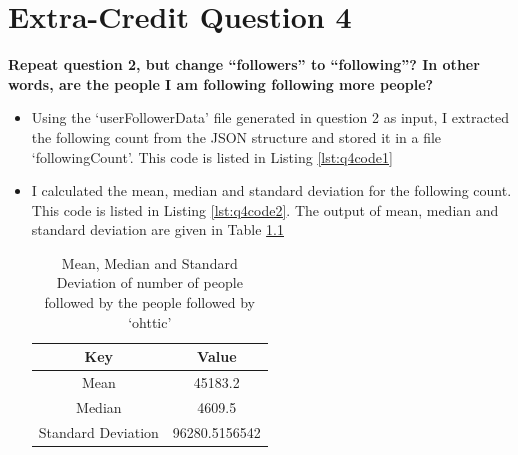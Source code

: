 \chapter{Extra-Credit Question 4}
\label{available-representation}

\textbf{Repeat question 2, but change ``followers'' to ``following''?  In other words, are the people I am following following more people?}

\begin{itemize}
\item Using the `userFollowerData' file generated in question 2 as input, I extracted the following \textunderscore count from the JSON structure and stored it in a file `followingCount'. This code is listed in Listing \ref{lst:q4code1}
\item I calculated the mean, median and standard deviation for the following count. This code is listed in Listing \ref{lst:q4code2}. The output of mean, median and standard deviation are given in Table \ref{Table:q4table1}

\begin{table}

\caption{Mean, Median and Standard Deviation of number of people followed by the people followed by `ohttic'}
\label{Table:q4table1}
\begin{center}
\begin{tabular}{| c | c |}
\hline
Key & Value \\ \hline

Mean & 45183.2 \\ \hline
Median & 4609.5 \\ \hline
Standard Deviation & 96280.5156542 \\ \hline

\hline

\end{tabular}
\end{center}
\end{table}


\end{itemize}
